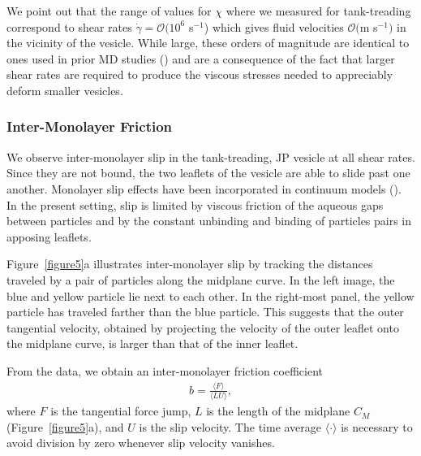 \documentclass[lineno]{jfm}
\begin{document}
We point out that the range of values for $\chi$ where we measured for
tank-treading correspond to shear rates $\dot \gamma = \mathcal{O}(10^6$
s$^{-1}$) which gives fluid velocities $\mathcal{O}($m s$^{-1}$$)$ in
the vicinity of the vesicle. While large, these orders of magnitude are identical to
ones used in prior MD studies (\cite{Brandner2019}) and are a
consequence of the fact that larger shear rates are required to produce
the viscous stresses needed to appreciably deform smaller vesicles. 

\subsubsection{Inter-Monolayer Friction}
We observe inter-monolayer slip in the tank-treading, JP vesicle at all
shear rates. Since they are not bound, the two leaflets of the vesicle
are able to slide past one another. 
Monolayer slip effects have been incorporated in continuum models (\cite{sch-vla-mik2010}).
In the present setting, slip is limited by viscous
friction of the aqueous gaps between particles and by the constant
unbinding and binding of particles pairs in apposing leaflets. 


Figure~\ref{figure5}a illustrates inter-monolayer slip by tracking the distances
traveled by a pair of particles along the midplane curve. In the left image, the blue and yellow
particle lie next to each other. In the right-most panel, the yellow
particle has traveled farther than the blue particle. This suggests that
the outer tangential velocity, obtained by projecting the velocity of the
outer leaflet onto the midplane curve, 
is larger than that of the inner leaflet. 

From the data, we obtain an inter-monolayer friction coefficient 
\begin{align}
  b =  \frac{\langle F \rangle}{\langle L   U \rangle} ,
\end{align}
where $F$ is the tangential force jump, $L$ is the length of the
midplane $C_M$ (Figure~\ref{figure5}a), and $U$ is the slip velocity.
The time average $\langle \cdot \rangle$ is necessary to avoid division by zero
whenever slip velocity vanishes.  

\end{document}
